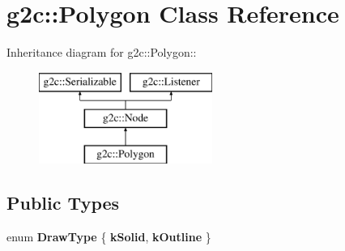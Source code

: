 \hypertarget{classg2c_1_1_polygon}{
\section{g2c::Polygon Class Reference}
\label{classg2c_1_1_polygon}
}
Inheritance diagram for g2c::Polygon::\begin{figure}[H]
\begin{center}
\leavevmode
\includegraphics[height=3cm]{classg2c_1_1_polygon}
\end{center}
\end{figure}
\subsection*{Public Types}
\begin{DoxyCompactItemize}
\item 
enum {\bfseries DrawType} \{ {\bfseries kSolid}, 
{\bfseries kOutline}
 \}
\end{DoxyCompactItemize}
